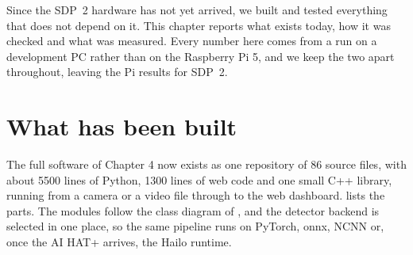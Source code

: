 Since the SDP~2 hardware has not yet arrived, we built and tested everything that does not depend on it. This chapter reports what exists today, how it was checked and what was measured. Every number here comes from a run on a development PC rather than on the Raspberry Pi 5, and we keep the two apart throughout, leaving the Pi results for SDP~2.

\section{What has been built}
\label{sec:built}

The full software of Chapter 4 now exists as one repository of 86 source files, with about 5500 lines of Python, 1300 lines of web code and one small C++ library, running from a camera or a video file through to the web dashboard.  lists the parts. The modules follow the class diagram of , and the detector backend is selected in one place, so the same pipeline runs on PyTorch, \gls{onnx}, NCNN or, once the AI HAT+ arrives, the Hailo runtime.

